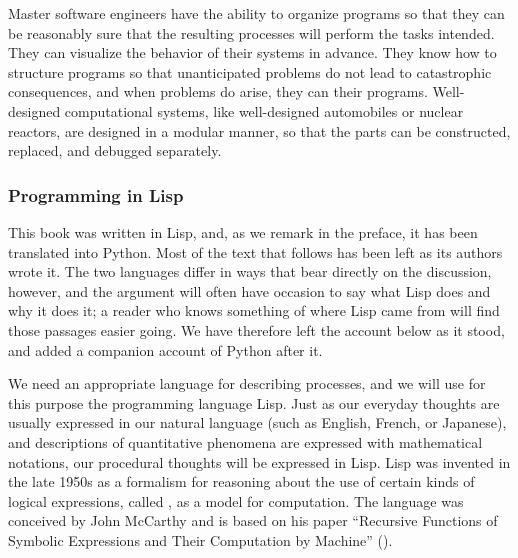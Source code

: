 Master software engineers have the ability to organize programs so that they
can be reasonably sure that the resulting processes will perform the tasks
intended. They can visualize the behavior of their systems in advance. They
know how to structure programs so that unanticipated problems do not lead to
catastrophic consequences, and when problems do arise, they can 
their programs. Well-designed computational systems, like well-designed
automobiles or nuclear reactors, are designed in a modular manner, so that the
parts can be constructed, replaced, and debugged separately.

\subsubsection*{Programming in Lisp}

This book was written in Lisp, and, as we remark in the preface, it has been
translated into Python. Most of the text that follows has been left as its
authors wrote it. The two languages differ in ways that bear directly on the
discussion, however, and the argument will often have occasion to say what Lisp
does and why it does it; a reader who knows something of where Lisp came from
will find those passages easier going. We have therefore left the account below
as it stood, and added a companion account of Python after it.

We need an appropriate language for describing processes, and we will use for
this purpose the programming language Lisp. Just as our everyday thoughts are
usually expressed in our natural language (such as English, French, or
Japanese), and descriptions of quantitative phenomena are expressed with
mathematical notations, our procedural thoughts will be expressed in Lisp.
Lisp was invented in the late 1950s as a formalism for reasoning about the use
of certain kinds of logical expressions, called ,
as a model for computation. The language was conceived by John McCarthy and is
based on his paper ``Recursive Functions of Symbolic Expressions and Their
Computation by Machine'' ().

